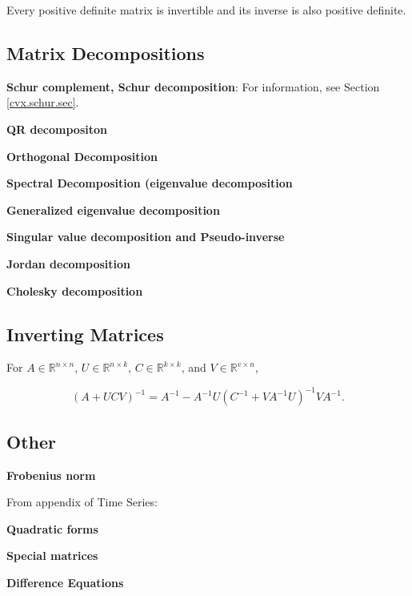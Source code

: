Every positive definite matrix is invertible and its inverse is also positive definite.

\subsection{Matrix Decompositions}\label{linalg.mat.decomp}

\textbf{Schur complement, Schur decomposition}: For information, see Section \ref{cvx.schur.sec}.

\textbf{QR decompositon}

\textbf{Orthogonal Decomposition}

\textbf{Spectral Decomposition (eigenvalue decomposition}

\textbf{Generalized eigenvalue decomposition}

\textbf{Singular value decomposition and Pseudo-inverse}

\textbf{Jordan decomposition}

\textbf{Cholesky decomposition}

\subsection{Inverting Matrices}

\begin{theorem} For \(A \in \mathbb{R}^{n \times n}\), \(U \in \mathbb{R}^{n \times k}\), \(C \in \mathbb{R}^{k \times k}\), and \(V \in \mathbb{R}^{v \times n}\),

\[
(A + UCV)^{-1} = A^{-1} - A^{-1}U(C^{-1} + VA^{-1}U)^{-1}VA^{-1}.
\]

\end{theorem}

\begin{theorem}

\end{theorem}

\subsection{Other}

\textbf{Frobenius norm}

From appendix of Time Series:

\textbf{Quadratic forms}

\textbf{Special matrices}

\textbf{Difference Equations}

